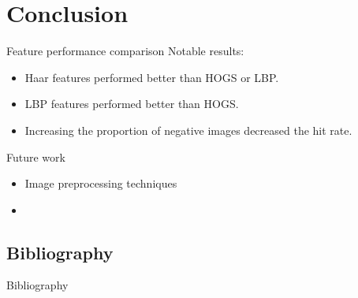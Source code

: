 \documentclass{beamer}
\begin{document}
\section{Conclusion}

\begin{frame}{Feature performance comparison}
	Notable results: \par
	\begin{itemize}
		\item Haar features performed better than HOGS or LBP.
		\item LBP features performed better than HOGS.
		\item Increasing the proportion of negative images decreased the hit rate.
	\end{itemize}
\end{frame}

\begin{frame}{Future work}
	\begin{itemize}
		\item Image preprocessing techniques
		\item 
	\end{itemize}
\end{frame}

\subsection{Bibliography}

\begin{frame}{Bibliography}
	\footnotesize
	
	
\end{frame}
\end{document}
